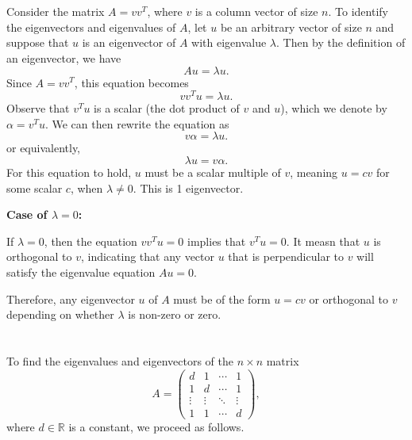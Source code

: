 \documentclass{article}
\begin{document}
\section{}

Consider the matrix \( A = vv^T \), where \( v \) is a column vector of size \( n \). To identify the eigenvectors and eigenvalues of \( A \), let \( u \) be an arbitrary vector of size \( n \) and suppose that \( u \) is an eigenvector of \( A \) with eigenvalue \( \lambda \). Then by the definition of an eigenvector, we have
\[
    Au = \lambda u.
\]
Since \( A = vv^T \), this equation becomes
\[
    vv^T u = \lambda u.
\]
Observe that \( v^T u \) is a scalar (the dot product of \( v \) and \( u \)), which we denote by \( \alpha = v^T u \). We can then rewrite the equation as
\[
    v\alpha = \lambda u.
\]
or equivalently,
\[
    \lambda u = v\alpha.
\]
For this equation to hold, \( u \) must be a scalar multiple of \( v \),
meaning \( u = cv \) for some scalar \( c \), when \( \lambda \neq 0 \). This is 1 eigenvector.

\textbf{Case of \( \lambda = 0 \):}

If \( \lambda = 0 \), then the equation \( vv^T u = 0 \) implies that \( v^T u = 0 \). It measn that \( u \) is orthogonal to \( v \), indicating that any vector \( u \) that is perpendicular to \( v \) will satisfy the eigenvalue equation \( Au = 0 \).

Therefore, any eigenvector \( u \) of \( A \) must be
of the form \( u = cv \) or orthogonal to \( v \)
depending on whether \( \lambda \) is non-zero or zero.

\section{}

To find the eigenvalues and eigenvectors of the \( n \times n \) matrix
\[
    A = \left( \begin{array}{cccc}
            d      & 1      & \cdots & 1      \\
            1      & d      & \cdots & 1      \\
            \vdots & \vdots & \ddots & \vdots \\
            1      & 1      & \cdots & d
        \end{array} \right),
\]
where \( d \in \mathbb{R} \) is a constant, we proceed as follows.
\end{document}
